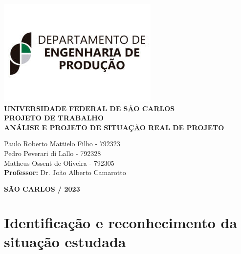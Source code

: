\documentclass[11pt]{article}
\begin{document}
\justifying %
\onehalfspacing %
\setlength{\parindent}{0cm}  %
\renewcommand*\familydefault{\rmdefault}
\thispagestyle{empty}
\begin{center}
\includegraphics[scale=0.6]{logo-dep.jpg}\\
\vspace*{.8cm}
{\huge \textbf{UNIVERSIDADE FEDERAL DE SÃO CARLOS}}\\
\vspace*{.8cm}
{\Large \textbf{PROJETO DE TRABALHO}}\\
\vspace*{3cm}
{\Large \textbf{ANÁLISE E PROJETO DE SITUAÇÃO REAL DE PROJETO}}\\
\vspace*{4.5cm}
\begin{flushright}
    \onehalfspacing
    {\Large  Paulo Roberto Mattielo Filho - 792323}\\
    {\Large  Pedro Peverari di Lallo - 792328}\\
    {\Large  Matheus Ossent de Oliveira - 792305 }\\
    \vspace*{.3cm}
    {\Large \textbf{Professor:}}
    {\Large Dr. João Alberto Camarotto}\\
\end{flushright}
\vspace*{\fill}
{\large \bf SÃO CARLOS / 2023}
\end{center}

\newpage{}

\tableofcontents


\newpage{}

\section{Identificação e reconhecimento da situação estudada}
\end{document}
